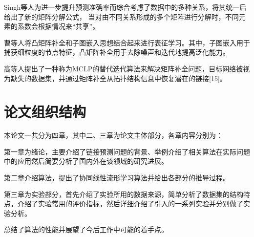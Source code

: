 Singh等人为进一步提升预测准确率而综合考虑了数据中的多种关系，将其统一后给出了新的矩阵分解公式，
当对由不同关系形成的多个矩阵进行分解时，不同元素的系数会根据情况来“共享”。


曹等人将凸矩阵补全和子图嵌入思想结合起来进行表征学习。其中，子图嵌入用于捕获细粒度的节点特征，凸矩阵补全用于去除噪声和迭代地提高泛化能力。


高等人提出了一种称为MCLP的替代迭代算法来解决矩阵补全问题，目标网络被视为缺失的数据集，并通过矩阵补全从拓扑结构信息中恢复潜在的链接[15]。

\section{论文组织结构}
本论文一共分为四章，其中二、三章为论文主体部分，各章内容分别为：


第一章为绪论，主要介绍了链接预测问题的背景、举例介绍了相关算法在实际问题中的应用然后简要分析了国内外在该领域的研究进展。


第二章介绍算法，提出了协同线性流形学习算法并给出各部分的推导过程。


第三章为实验部分，首先介绍了实验所用的数据来源，简单分析了数据集的结构特点，介绍了实验常用的评价指标，然后详细介绍了引入的一系列实验并分别做了实验分析。


总结了算法的性能并展望了今后工作中可能的着手点。